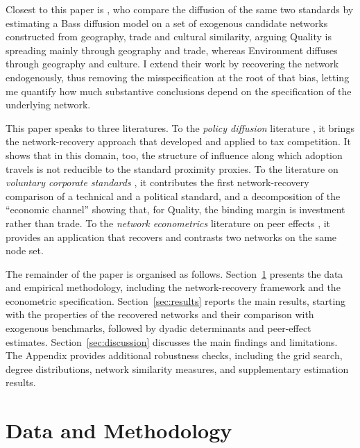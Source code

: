 \documentclass[12pt,a4paper]{article}
\begin{document}
Closest to this paper is \citet{albuquerque2007}, who compare the diffusion of the same
two standards by estimating a Bass diffusion model on a set of exogenous candidate
networks constructed from geography, trade and cultural similarity, arguing Quality is
spreading mainly through geography and trade, whereas Environment diffuses through
geography and culture. I extend their work by recovering the network endogenously, thus
removing the misspecification at the root of that bias, letting me quantify how much
substantive conclusions depend on the specification of the underlying network.

This paper speaks to three literatures. To the \emph{policy diffusion} literature
\citep{gilardi2019, linsenmeier2023}, it brings the network-recovery approach that
\citet{depaula2025} developed and applied to tax competition. It shows that in this
domain, too, the structure of influence along which adoption travels is not reducible to
the standard proximity proxies. To the literature on \emph{voluntary corporate standards}
\citep{guler2002, albuquerque2007, corbett2006, berliner2013, vanderheijden2020}, it contributes the first
network-recovery comparison of a technical and a political standard, and a decomposition
of the ``economic channel'' showing that, for Quality, the binding margin is investment
rather than trade. To the \emph{network econometrics} literature on peer effects
\citep{manski1993, bramoulle2009, depaula2025}, it provides an application that recovers
and contrasts two networks on the same node set.

The remainder of the paper is organised as follows. Section~\ref{sec:data-and-methodology}
presents the data and empirical methodology, including the network-recovery framework
and the econometric specification. Section~\ref{sec:results} reports the main results,
starting with the properties of the recovered networks and their comparison with
exogenous benchmarks, followed by dyadic determinants and peer-effect estimates.
Section~\ref{sec:discussion} discusses the main findings and limitations. The Appendix
provides additional robustness checks, including the grid search, degree distributions,
network similarity measures, and supplementary estimation results.
\clearpage
\section{Data and Methodology}
\label{sec:data-and-methodology}
\end{document}

